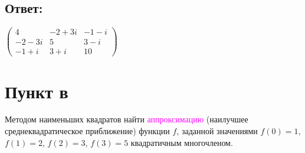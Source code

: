 \documentclass[12pt]{article}
\begin{document}
    \subsection*{Ответ:}
    $
    \begin{pmatrix}
        4       & -2 + 3i & -1 - i \\
        -2 - 3i & 5       & 3 - i  \\
        -1 + i  & 3 + i   & 10
    \end{pmatrix}
    $

    \section*{Пункт в}
    Методом наименьших квадратов найти \textcolor{magenta}{аппроксимацию} (наилучшее среднеквадратическое приближение) функции $f$, заданной значениями $f(0) = 1$, $f(1)=2$, $f(2)=3$, $f(3)=5$ квадратичным
    многочленом.
\end{document}

